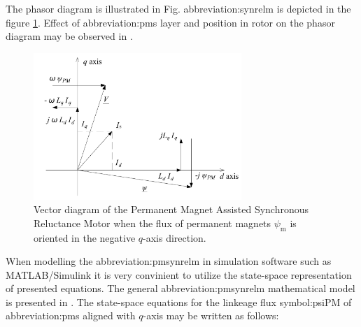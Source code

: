 \documentclass[a4paper, twoside, 11pt]{article}
\begin{document}
        The phasor diagram is illustrated in Fig. \gls{abbreviation:synrelm} is depicted in the figure \ref{fig:cad-pmasynrm-vector-diagram}. Effect of \gls{abbreviation:pm}s layer and position in rotor on the phasor diagram may be observed in \cite{huynh-design-and-analysis-of-perm-as-synch-rel-m}.
        \begin{figure}[htbp!]
            \centering
            \includegraphics[width=0.70\textwidth]{src/pdf/cad-pmasynrm-vector-diagram.pdf}
            \caption{Vector diagram of the Permanent Magnet Assisted Synchronous Reluctance Motor when the flux of permanent magnets $\psi_\text{m}$ is oriented in the negative $q$-axis direction.}
            \label{fig:cad-pmasynrm-vector-diagram}
        \end{figure}
    
    \par

    When modelling the \gls{abbreviation:pmsynrelm} in simulation software such as MATLAB/Simulink it is very convinient to utilize the state-space representation of presented equations. The general \gls{abbreviation:pmsynrelm} mathematical model is presented in \cite{sriprang-Design-Modeling-and-Model-Free-Control-of-Permanent-Magnet-Assisted-Synchronous-Reluctance-Motor-for-e-Vehicle-Applications}. The state-space equations for the linkeage flux \gls{symbol:psiPM} of \gls{abbreviation:pm}s aligned with $q$-axis may be written as follows:
\end{document}
